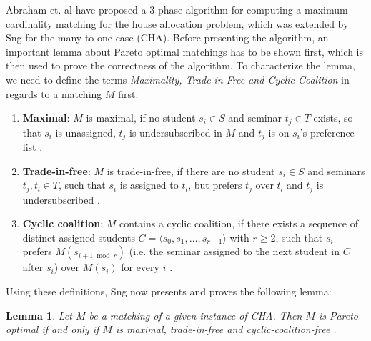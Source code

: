 Abraham et. al \cite{Abraham:Pacha} have proposed a 3-phase algorithm for computing a maximum cardinality matching for the house allocation problem, which was extended by Sng \cite{SngThesis} for the many-to-one case (CHA). Before presenting the algorithm, an important lemma about Pareto optimal matchings has to be shown first, which is then used to prove the correctness of the algorithm. To characterize the lemma, we need to define the terms \emph{Maximality, Trade-in-Free and Cyclic Coalition} in regards to a matching $M$ first: 
\begin{enumerate}
    \item \textbf{Maximal}: $M$ is maximal, if no student $s_i \in S$ and seminar $t_j \in T$ exists, so that $s_i$ is unassigned, $t_j$ is undersubscribed in $M$ and $t_j$ is on $s_i$'s preference list \cite{Abraham:Pacha}.
    \item \textbf{Trade-in-free}: $M$ is trade-in-free, if there are no student $s_i \in S$ and seminars $t_j, t_l \in T$, such that $s_i$ is assigned to $t_l$, but prefers $t_j$ over $t_l$ and $t_j$ is undersubscribed \cite{Abraham:Pacha}. 
    \item \textbf{Cyclic coalition}: $M$ contains a cyclic coalition, if there exists a sequence of distinct assigned students $C = \langle s_0, s_1, \dots, s_{r-1} \rangle$ with $r \geq 2$, such that $s_i$ prefers $M(s_{i + 1 \bmod r})$ (i.e. the seminar assigned to the next student in $C$ after $s_i$) over $M(s_i)$ for every $i$ \cite{Abraham:Pacha}.
\end{enumerate}
Using these definitions, Sng now presents and proves the following lemma:
\newtheorem{lemma}[theorem]{Lemma}
\begin{lemma}\label{lemma-pacha}
    Let $M$ be a matching of a given instance of CHA. Then $M$ is Pareto optimal if and only if $M$ is maximal, trade-in-free and cyclic-coalition-free \cite{Abraham:Pacha}.
\end{lemma}

